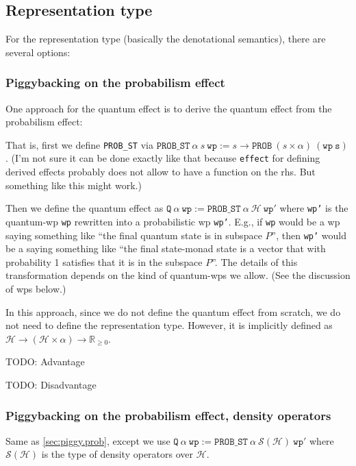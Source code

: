 \documentclass[a4paper]{article}
\newcommand\setR{\mathbb R}
\newcommand\Rpos{\setR_{\geq0}}
\newcommand\calH{\mathcal H}
\newcommand\density{\mathcal S(\calH)}
\begin{document}
\subsection{Representation type}

For the representation type (basically the denotational semantics), there are several options:

\subsubsection{Piggybacking on the probabilism effect}
\label{sec:piggy.prob}
  
One approach for the quantum effect is to derive the quantum effect
from the probabilism effect:

That is, first we define \texttt{PROB\_ST} via
$\mathtt{PROB\_ST}\ \alpha\ s\ \mathtt{wp} := s \to \mathtt{PROB}\
(s\times \alpha)\ \mathtt{(wp\ s)}$. (I'm not sure it can be done exactly like that
because \texttt{effect} for defining derived effects probably does not
allow to have a function on the rhs. But something like this might
work.)

Then we define the quantum effect as
$\mathtt{Q}\ \alpha\ \mathtt{wp} := \mathtt{PROB\_ST}\ \alpha\ \calH\
\mathtt{wp'}$ where \texttt{wp'} is the quantum-wp \texttt{wp}
rewritten into a probabilistic wp \texttt{wp'}.  E.g., if \texttt{wp}
would be a wp saying something like ``the final quantum state is in
subspace $P$'', then \texttt{wp'} would be a saying something like ``the final state-monad state is a vector that with probability 1 satisfies that it is in the subspace $P$''. The details of this transformation depends on the kind of quantum-wps we allow. (See the discussion of wps below.)

In this approach, since we do not define the quantum effect from scratch, we do not need to define the representation type.
However, it is implicitly defined as $\calH\to(\calH\times\alpha)\to\Rpos$.

TODO: Advantage

TODO: Disadvantage

\subsubsection{Piggybacking on the probabilism effect, density operators}

Same as \autoref{sec:piggy.prob}, except we use 
$\mathtt{Q}\ \alpha\ \mathtt{wp} := \mathtt{PROB\_ST}\ \alpha\ \density\
\mathtt{wp'}$ where $\density$ is the type of density operators over $\calH$.
\end{document}
